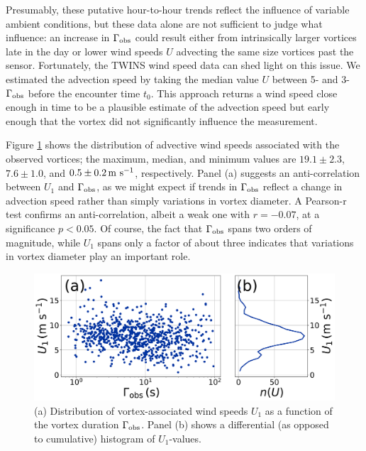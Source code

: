 \documentclass{aastex63}
\begin{document}
Presumably, these putative hour-to-hour trends reflect the influence of variable ambient conditions, but these data alone are not sufficient to judge what influence: an increase in $\Gamma_{\rm obs}$ could result either from intrinsically larger vortices late in the day or lower wind speeds $U$ advecting the same size vortices past the sensor. Fortunately, the TWINS wind speed data can shed light on this issue. We estimated the advection speed by taking the median value $U$ between 5- and 3-$\Gamma_{\rm obs}$ before the encounter time $t_0$. This approach returns a wind speed close enough in time to be a plausible estimate of the advection speed but early enough that the vortex did not significantly influence the measurement. 

Figure \ref{fig:U1_vs_Gamma_hist} shows the distribution of advective wind speeds associated with the observed vortices; the maximum, median, and minimum values are $19.1\pm2.3$, $7.6\pm1.0$, and $0.5\pm0.2 \,{\rm m\ s^{-1}}$, respectively. Panel (a) suggests an anti-correlation between $U_1$ and $\Gamma_{\rm obs}$, as we might expect if trends in $\Gamma_{\rm obs}$ reflect a change in advection speed rather than simply variations in vortex diameter. A Pearson-r test confirms an anti-correlation, albeit a weak one with $r = -0.07$, at a significance $p < 0.05$. Of course, the fact that $\Gamma_{\rm obs}$ spans two orders of magnitude, while $U_1$ spans only a factor of about three indicates that variations in vortex diameter play an important role. 

\begin{figure}
    \centering
    \includegraphics[width=\textwidth]{figures/U1_vs_Gamma_hist.png}
    \caption{(a) Distribution of vortex-associated wind speeds $U_1$ as a function of the vortex duration $\Gamma_{\rm obs}$. Panel (b) shows a differential (as opposed to cumulative) histogram of $U_1$-values.}
    \label{fig:U1_vs_Gamma_hist}
\end{figure}
\end{document}
